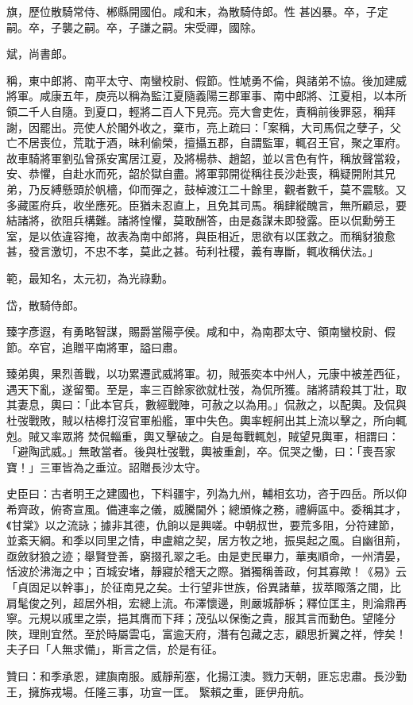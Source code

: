 \begin{pinyinscope}
 旗，歷位散騎常侍、郴縣開國伯。咸和末，為散騎侍郎。性
 甚凶暴。卒，子定嗣。卒，子襲之嗣。卒，子謙之嗣。宋受禪，國除。



 斌，尚書郎。



 稱，東中郎將、南平太守、南蠻校尉、假節。性虓勇不倫，與諸弟不協。後加建威將軍。咸康五年，庾亮以稱為監江夏隨義陽三郡軍事、南中郎將、江夏相，以本所領二千人自隨。到夏口，輕將二百人下見亮。亮大會吏佐，責稱前後罪惡，稱拜謝，因罷出。亮使人於閣外收之，棄市，亮上疏曰：「案稱，大司馬侃之孽子，父亡不居喪位，荒耽于酒，昧利偷榮，擅攝五郡，自謂監軍，輒召王官，聚之軍府。
 故車騎將軍劉弘曾孫安寓居江夏，及將楊恭、趙韶，並以言色有忤，稱放聲當殺，安、恭懼，自赴水而死，韶於獄自盡。將軍郭開從稱往長沙赴喪，稱疑開附其兄弟，乃反縛懸頭於帆檣，仰而彈之，鼓棹渡江二十餘里，觀者數千，莫不震駭。又多藏匿府兵，收坐應死。臣猶未忍直上，且免其司馬。稱肆縱醜言，無所顧忌，要結諸將，欲阻兵構難。諸將惶懼，莫敢酬答，由是姦謀未即發露。臣以侃勳勞王室，是以依違容掩，故表為南中郎將，與臣相近，思欲有以匡救之。而稱豺狼愈甚，發言激切，不忠不孝，莫此之甚。茍利社稷，義有專斷，輒收稱伏法。」



 範，最知名，太元初，為光祿勳。



 岱，散騎侍郎。



 臻字彥遐，有勇略智謀，賜爵當陽亭侯。咸和中，為南郡太守、領南蠻校尉、假節。卒官，追贈平南將軍，謚曰肅。



 臻弟輿，果烈善戰，以功累遷武威將軍。初，賊張奕本中州人，元康中被差西征，遇天下亂，遂留蜀。至是，率三百餘家欲就杜弢，為侃所獲。諸將請殺其丁壯，取其妻息，輿曰：「此本官兵，數經戰陣，可赦之以為用。」侃赦之，以配輿。及侃與杜弢戰敗，賊以桔槔打沒官軍船艦，軍中失色。輿率輕舸出其上流以擊之，所向輒剋。賊又率眾將
 焚侃輜重，輿又擊破之。自是每戰輒剋，賊望見輿軍，相謂曰：「避陶武威。」無敢當者。後與杜弢戰，輿被重創，卒。侃哭之慟，曰：「喪吾家寶！」三軍皆為之垂泣。詔贈長沙太守。



 史臣曰：古者明王之建國也，下料疆宇，列為九州，輔相玄功，咨于四岳。所以仰希齊政，俯寄宣風。備連率之儀，威騰閫外；總頒條之務，禮縟區中。委稱其才，《甘棠》以之流詠；據非其德，仇餉以是興嗟。中朝叔世，要荒多阻，分符建節，並紊天綱。和季以同里之情，申盧綰之契，居方牧之地，振吳起之風。自幽徂荊，亟斂豺狼之迹；舉賢登善，窮掇孔翠之毛。由是吏民畢力，華夷順命，一州清晏，
 恬波於沸海之中；百城安堵，靜寢於稽天之際。猶獨稱善政，何其寡歟！《易》云「貞固足以幹事」，於征南見之矣。士行望非世族，俗異諸華，拔萃陬落之間，比肩髦俊之列，超居外相，宏總上流。布澤懷邊，則嚴城靜柝；釋位匡主，則淪鼎再寧。元規以戚里之崇，挹其膺而下拜；茂弘以保衡之貴，服其言而動色。望隆分陜，理則宜然。至於時屬雲屯，富逾天府，潛有包藏之志，顧思折翼之祥，悖矣！夫子曰「人無求備」，斯言之信，於是有征。



 贊曰：和季承恩，建旟南服。威靜荊塞，化揚江澳。戮力天朝，匪忘忠肅。長沙勤王，擁旆戎場。任隆三事，功宣一匡。
 繄賴之重，匪伊舟航。



\end{pinyinscope}